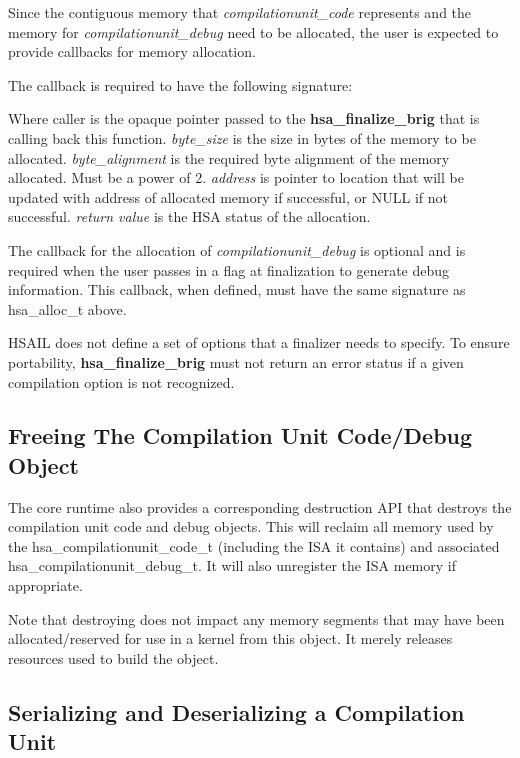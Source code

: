 \documentclass{book}
\newcommand{\reffun}[1]{\textbf{#1}}
\newcommand{\reftyp}[1]{#1}
\begin{document}
\begin{appendices}
Since the contiguous memory that {\itshape
compilationunit\_code} represents and the memory for {\itshape
compilationunit\_debug} need to be allocated, the user is expected
to provide callbacks for memory allocation.

The callback is required to have the following signature:


Where caller is the opaque pointer passed to the
\reffun{hsa\_finalize\_brig} that is calling back this function.
{\itshape byte\_size} is the size in bytes of the memory to be
allocated.  {\itshape byte\_alignment} is the required byte alignment
of the memory allocated. Must be a power of 2.  {\itshape address} is
pointer to location that will be updated with address of allocated
memory if successful, or NULL if not successful.  {\itshape return
  value} is the HSA status of the allocation.

The callback for the allocation of {\itshape compilationunit\_debug}
is optional and is required when the user passes in a flag at
finalization to generate debug information. This callback, when
defined, must have the same signature as \reftyp{hsa\_alloc\_t} above.



HSAIL does not define a set of options that a finalizer
needs to specify. To ensure portability, \reffun{hsa\_finalize\_brig}
must not return an error status if a given compilation option is not
recognized.

\subsection{Freeing The Compilation Unit Code/Debug Object}

The core runtime also provides a corresponding destruction API that
destroys the compilation unit code and debug objects.  This will
reclaim all memory used by the
\reftyp{hsa\_compilationunit\_code\_t} (including the ISA it
contains) and associated \reftyp{hsa\_compilationunit\_debug\_t}. It
will also unregister the ISA memory if appropriate.



Note that destroying does not impact any memory segments that may
have been allocated/reserved for use in a kernel from this object.
It merely releases resources used to build the object.

\subsection{Serializing and Deserializing a Compilation Unit}


\end{appendices}
\end{document}
